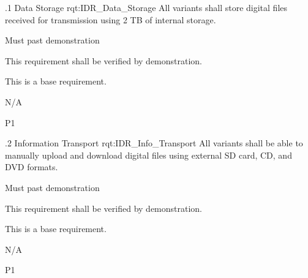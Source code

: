 \ONERQMTVKSA
{\RqtNumberBase.1}
{Data Storage}
{rqt:IDR_Data_Storage}
{All \ThisSystem variants shall store digital files received for transmission using 2 TB of internal storage.}
{
	\item [Phase 1] Must past demonstration
}
{This requirement shall be verified by demonstration.}
{
\item [N/A] This is a base requirement.
}
{
	\item N/A
}
{P1}


\ONERQMTVKSA
{\RqtNumberBase.2}
{Information Transport}
{rqt:IDR_Info_Transport}
{All \ThisSystem variants shall be able to manually upload and download digital files using external SD card, CD, and DVD formats.}
{
	\item [Phase 1] Must past demonstration
}
{This requirement shall be verified by demonstration.}
{
\item [N/A] This is a base requirement.
}
{
	\item N/A
}
{P1}
